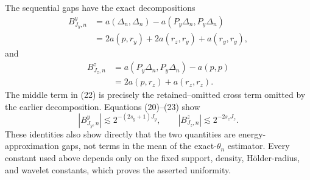 The sequential gaps have the exact decompositions
\[
\begin{aligned}
B^y_{J_y,n}
&=a(\Delta_n,\Delta_n)-a(P_y\Delta_n,P_y\Delta_n)\\
&=2a(p,r_y)+2a(r_z,r_y)+a(r_y,r_y),
\end{aligned} \tag{22}
\]
and
\[
\begin{aligned}
B^z_{J_z,n}
&=a(P_y\Delta_n,P_y\Delta_n)-a(p,p)\\
&=2a(p,r_z)+a(r_z,r_z).
\end{aligned} \tag{23}
\]
The middle term in (22) is precisely the retained--omitted cross term omitted by the earlier decomposition.  Equations (20)--(23) show
\[
|B^y_{J_y,n}|\lesssim2^{-(2s_y+1)J_y},
\qquad
|B^z_{J_z,n}|\lesssim2^{-2s_zJ_z}. \tag{24}
\]
These identities also show directly that the two quantities are energy-approximation gaps, not terms in the mean of the exact-\(\theta_n\) estimator.  Every constant used above depends only on the fixed support, density, H\"older-radius, and wavelet constants, which proves the asserted uniformity.